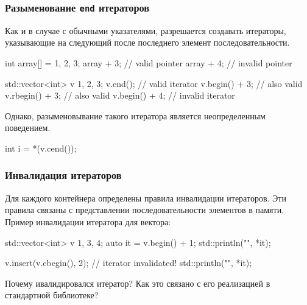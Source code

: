 \documentclass[compress, 8pt, aspectratio=169]{beamer}
\begin{document}
  \begin{frame}[fragile]

    \frametitle{Разыменование \texttt{end} итераторов}

    Как и в случае с обычными указателями, разрешается создавать
    итераторы, указывающие на следующий после последнего элемент
    последовательности.

    \begin{mycppinplacelisting}
int array[] = {1, 2, 3};
array + 3; // valid pointer
array + 4; // invalid pointer

std::vector<int> v {1, 2, 3};
v.end(); // valid iterator
v.begin() + 3; // also valid
v.rbegin() + 3; // also valid
v.begin() + 4; // invalid iterator
    \end{mycppinplacelisting}

    Однако, разыменовывание такого итератора является
    неопределенным поведением.

    \begin{mycppinplacelisting}
int i = *(v.cend());
    \end{mycppinplacelisting}

  \end{frame}

  \begin{frame}[fragile]

    \frametitle{Инвалидация итераторов}

    Для каждого контейнера определены правила инвалидации
    итераторов.
    Эти правила связаны с представлении последовательности
    элементов в памяти.
    Пример инвалидации итератора для вектора:

    \begin{mycppinplacelisting}
std::vector<int> v {1, 3, 4};
auto it = v.begin() + 1;
std::println("{}", *it);

v.insert(v.cbegin(), 2);
// iterator invalidated!
std::println("{}", *it);
    \end{mycppinplacelisting}

    \begin{task}
      Почему ивалидировался итератор? Как это связано с его реализацией
      в стандартной библиотеке?
    \end{task}

  \end{frame}
\end{document}
